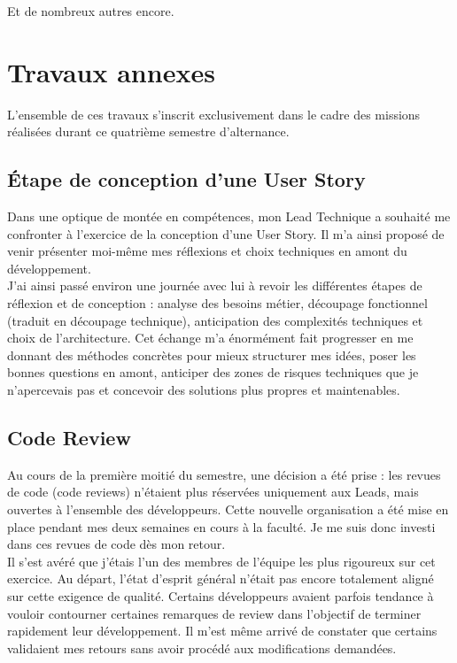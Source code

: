 \documentclass{article}
\begin{document}
Et de nombreux autres encore.

\newpage
\section{Travaux annexes}

L'ensemble de ces travaux s'inscrit exclusivement dans le cadre des missions réalisées durant ce quatrième semestre d'alternance.

\subsection{ Étape de conception d'une User Story}

Dans une optique de montée en compétences, mon Lead Technique a souhaité me confronter à l'exercice de la conception d'une User Story. Il m'a ainsi proposé de venir présenter moi-même mes réflexions et choix techniques en amont du développement. \\

J'ai ainsi passé environ une journée avec lui à revoir les différentes étapes de réflexion et de conception : analyse des besoins métier, découpage fonctionnel (traduit en découpage technique), anticipation des complexités techniques et choix de l'architecture. Cet échange m'a énormément fait progresser en me donnant des méthodes concrètes pour mieux structurer mes idées, poser les bonnes questions en amont, anticiper des zones de risques techniques que je n'apercevais pas et concevoir des solutions plus propres et maintenables.

\subsection{ Code Review}

Au cours de la première moitié du semestre, une décision a été prise : les revues de code (code reviews) n'étaient plus réservées uniquement aux Leads, mais ouvertes à l'ensemble des développeurs. Cette nouvelle organisation a été mise en place pendant mes deux semaines en cours à la faculté. Je me suis donc investi dans ces revues de code dès mon retour. \\

Il s'est avéré que j'étais l'un des membres de l'équipe les plus rigoureux sur cet exercice. Au départ, l'état d'esprit général n'était pas encore totalement aligné sur cette exigence de qualité. Certains développeurs avaient parfois tendance à vouloir contourner certaines remarques de review dans l'objectif de terminer rapidement leur développement. Il m'est même arrivé de constater que certains validaient mes retours sans avoir procédé aux modifications demandées. \\
\end{document}
